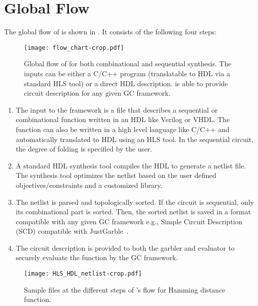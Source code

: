 \chapter{Global Flow}\label{chap:global}
The global flow of \sys{} is shown in .
It consists of the following four steps:

\begin{figure*}
\centering
\texttt{[image: flow\_chart-crop.pdf]}
\caption{Global flow of \sys{} for both combinational and sequential synthesis.
  The inputs can be either a C/C++ program (translatable to HDL via a standard HLS tool) or a direct HDL description.
  \sys{} is able to provide circuit description for any given GC framework.}
\label{fig:globalflow}
\end{figure*}

\begin{enumerate}
\item
  The input to the \sys{} framework is a file that describes a sequential or combinational function written in an HDL like Verilog or VHDL.
  The function can also be written in a high level language like C/C++ and automatically translated to HDL using an HLS tool.
  In the sequential circuit, the degree of folding is specified by the user.

\item
  A standard HDL synthesis tool compiles the HDL to generate a netlist file.
  The synthesis tool optimizes the netlist based on the user defined objectives/constraints and a customized library.

\item
  The netlist is parsed and topologically sorted.
  If the circuit is sequential, only its combinational part is sorted.
  Then, the sorted netlist is saved in a format compatible with any given GC framework e.g., Simple Circuit Description (SCD) compatible with JustGarble~\cite{bellare2013efficient}.

\item
  The circuit description is provided to both the garbler and evaluator to securely evaluate the function by the GC framework.
\end{enumerate}

\begin{figure*}
\centering
\texttt{[image: HLS\_HDL\_netlist-crop.pdf]}
\caption{Sample files at the different steps of \sys{}'s flow for Hamming distance function.}
\label{fig:globalflow_sample}
\end{figure*}

